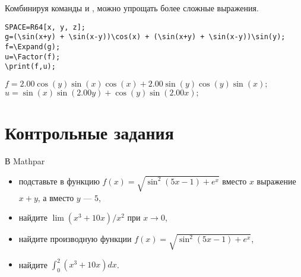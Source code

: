 Комбинируя команды  и , можно упрощать более сложные выражения.

\begin{verbatim}
SPACE=R64[x, y, z]; 
g=(\sin(x+y) + \sin(x-y))\cos(x) + (\sin(x+y) + \sin(x-y))\sin(y); 
f=\Expand(g);
u=\Factor(f);
\print(f,u);
\end{verbatim}\vspace*{-3mm}

{\hspace*{4mm} $f=2.00\cos(y)\sin(x)\cos(x)+2.00\sin(y)\cos(y)\sin(x);$\\
\hspace*{4mm} $u=\sin(x)\sin(2.00y)+\cos(y)\sin(2.00x);$} 





\section{Контрольные задания}
В  Mathpar 
\begin{itemize}
 \item подставьте в функцию $f(x)=\sqrt{\sin ^2(5x-1)+e^x}$ вместо $x$ выражение $x+y$,  а вместо $y$ --- $5$, 
 \item найдите  $\lim (x^3+10x)/x^2$  при $x\rightarrow 0$, 
 \item найдите производную функции $f(x)=\sqrt{\sin ^2(5x-1)+e^x}$, 
 \item найдите $\int_0^2(x^3+10x)dx$. 
 \end{itemize}
